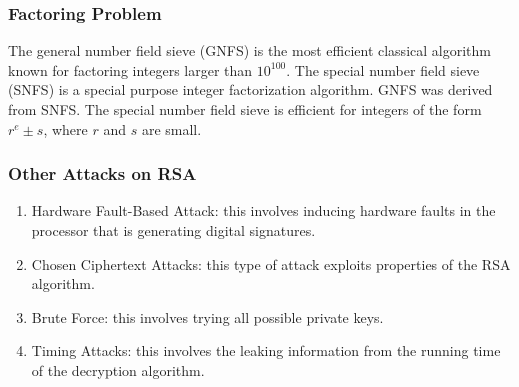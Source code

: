 \documentclass{math}
\begin{document}
\subsubsection*{Factoring Problem}
The general number field sieve (GNFS) is the most efficient classical algorithm
known for factoring integers larger than \( 10^{100} \). The special number
field sieve (SNFS) is a special purpose integer factorization algorithm. GNFS
was derived from SNFS. The special number field sieve is efficient for integers
of the form \( r^e\pm s \), where \( r \) and \( s \) are small.

\subsubsection*{Other Attacks on RSA}
\begin{enumerate}
  \item Hardware Fault-Based Attack: this involves inducing hardware faults in
  the processor that is generating digital signatures.
  \item Chosen Ciphertext Attacks: this type of attack exploits properties of
  the RSA algorithm.
  \item Brute Force: this involves trying all possible private keys.
  \item Timing Attacks: this involves the leaking information from the running
  time of the decryption algorithm.
\end{enumerate}
\end{document}
